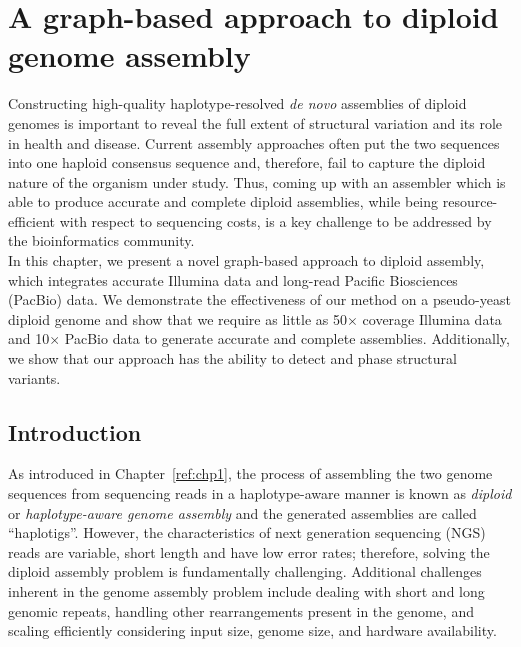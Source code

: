 \chapter{A graph-based approach to diploid genome assembly}
Constructing high-quality haplotype-resolved \textit{de novo} assemblies of diploid genomes is important to reveal the full extent of structural variation and its role in health and disease.
Current assembly approaches often put the two sequences into one haploid consensus sequence and, therefore, fail to capture the diploid nature of the organism under study.
Thus, coming up with an assembler which is able to produce accurate and complete diploid assemblies, while being resource-efficient with respect to sequencing costs, 
is a key challenge to be addressed by the bioinformatics community.\\

In this chapter, we present a novel graph-based approach to diploid assembly, which integrates accurate Illumina data and long-read Pacific Biosciences (PacBio) data.
We demonstrate the effectiveness of our method on a pseudo-yeast diploid genome and show that we require as little as 50$\times$ coverage Illumina data 
and 10$\times$ PacBio data to generate accurate and complete assemblies.
Additionally, we show that our approach has the ability to detect and phase structural variants.\\


\section{Introduction}
As introduced in Chapter~\ref{ref:chp1}, the process of assembling the two genome sequences from sequencing reads in a haplotype-aware manner is known as \textit{diploid} or \textit{haplotype-aware genome assembly} and the generated assemblies are called ``haplotigs''.
However, the characteristics of next generation sequencing (NGS) reads are variable, short length and have low error rates; therefore, solving the diploid assembly problem is fundamentally challenging.
Additional challenges inherent in the genome assembly problem include dealing with short and long genomic repeats, handling other rearrangements present in the genome, and scaling efficiently considering input size, genome size, and hardware availability.

